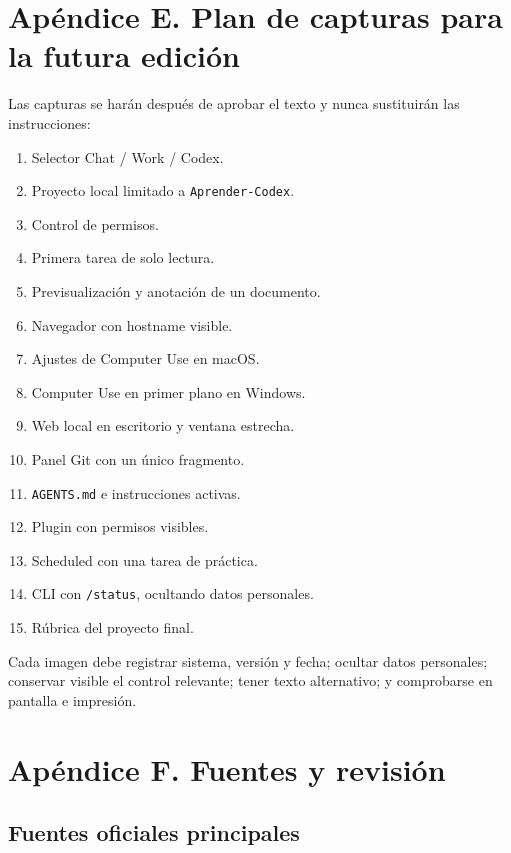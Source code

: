 \documentclass[10pt,a4paper,openany]{book}
\providecommand{\tightlist}{\setlength{\itemsep}{0.18em}\setlength{\parskip}{0pt}}
\begin{document}
\chapter{Apéndice E. Plan de capturas para la futura
edición}\label{apuxe9ndice-e.-plan-de-capturas-para-la-futura-ediciuxf3n}

Las capturas se harán después de aprobar el texto y nunca sustituirán
las instrucciones:

\begin{enumerate}
\def\labelenumi{\arabic{enumi}.}
\tightlist
\item
  Selector Chat / Work / Codex.
\item
  Proyecto local limitado a \texttt{Aprender-Codex}.
\item
  Control de permisos.
\item
  Primera tarea de solo lectura.
\item
  Previsualización y anotación de un documento.
\item
  Navegador con hostname visible.
\item
  Ajustes de Computer Use en macOS.
\item
  Computer Use en primer plano en Windows.
\item
  Web local en escritorio y ventana estrecha.
\item
  Panel Git con un único fragmento.
\item
  \texttt{AGENTS.md} e instrucciones activas.
\item
  Plugin con permisos visibles.
\item
  Scheduled con una tarea de práctica.
\item
  CLI con \texttt{/status}, ocultando datos personales.
\item
  Rúbrica del proyecto final.
\end{enumerate}

Cada imagen debe registrar sistema, versión y fecha; ocultar datos
personales; conservar visible el control relevante; tener texto
alternativo; y comprobarse en pantalla e impresión.

\chapter{Apéndice F. Fuentes y
revisión}\label{apuxe9ndice-f.-fuentes-y-revisiuxf3n}

\section{Fuentes oficiales
principales}\label{fuentes-oficiales-principales}
\end{document}
